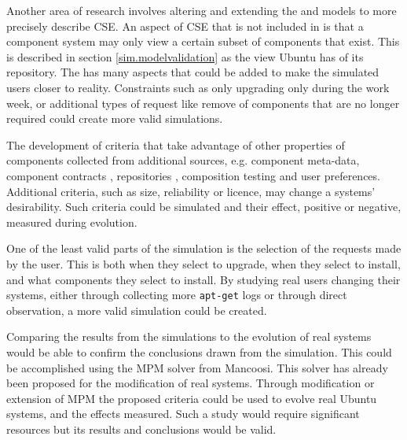 Another area of research involves altering and extending the \modelname and \usermodel models to more precisely describe CSE.
An aspect of CSE that is not included in \modelname is that a component system may only view a certain subset of components that exist.
This is described in section \ref{sim.modelvalidation} as the view Ubuntu has of its repository.
The \usermodel has many aspects that could be added to make the simulated users closer to reality.
Constraints such as only upgrading only during the work week, 
or additional types of request like remove of components that are no longer required could create more valid simulations.

The development of criteria that take advantage of other properties of components collected from additional sources, e.g. component meta-data, component contracts \citep{Watkins1999}, repositories \citep{Guo2000}, 
composition testing \citep{XuejieZhang2008} and user preferences.
Additional criteria, such as size, reliability or licence, may change a systems' desirability.
Such criteria could be simulated and their effect, positive or negative, measured during evolution.

One of the least valid parts of the simulation is the selection of the requests made by the user.
This is both when they select to upgrade, when they select to install, and what components they select to install.
By studying real users changing their systems, either through collecting more \texttt{apt-get} logs or through direct observation,
a more valid simulation could be created.

Comparing the results from the simulations to the evolution of real systems would be able to confirm the conclusions drawn from the simulation.
This could be accomplished using the MPM solver \citep{abate2011} from Mancoosi.
This solver has already been proposed for the modification of real systems.
Through modification or extension of MPM the proposed criteria could be used to evolve real Ubuntu systems, and the effects measured.
Such a study would require significant resources but its results and conclusions would be valid.    
